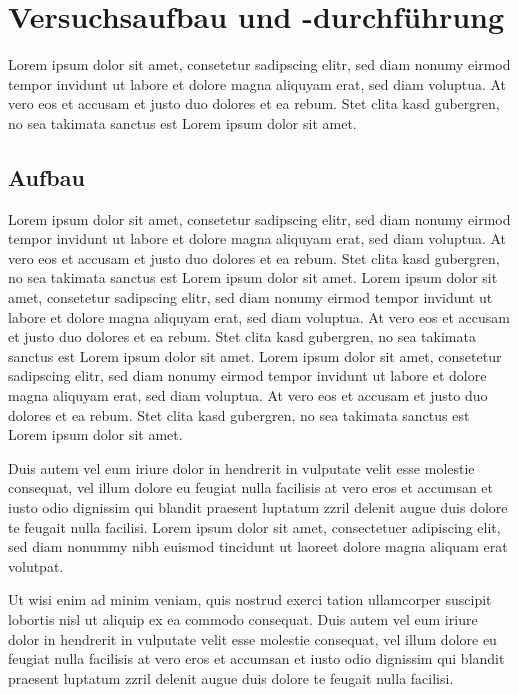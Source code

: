 \section{Versuchsaufbau und -durchführung} \label{sec:aufbau}

Lorem ipsum dolor sit amet, consetetur sadipscing elitr, sed diam nonumy eirmod tempor invidunt ut labore et dolore magna aliquyam erat, sed diam voluptua.
At vero eos et accusam et justo duo dolores et ea rebum.
Stet clita kasd gubergren, no sea takimata sanctus est Lorem ipsum dolor sit amet.

\subsection*{Aufbau}
	
	Lorem ipsum dolor sit amet, consetetur sadipscing elitr, sed diam nonumy eirmod tempor invidunt ut labore et dolore magna aliquyam erat, sed diam voluptua.
	At vero eos et accusam et justo duo dolores et ea rebum.
	Stet clita kasd gubergren, no sea takimata sanctus est Lorem ipsum dolor sit amet.
	Lorem ipsum dolor sit amet, consetetur sadipscing elitr, sed diam nonumy eirmod tempor invidunt ut labore et dolore magna aliquyam erat, sed diam voluptua.
	At vero eos et accusam et justo duo dolores et ea rebum.
	Stet clita kasd gubergren, no sea takimata sanctus est Lorem ipsum dolor sit amet.
	Lorem ipsum dolor sit amet, consetetur sadipscing elitr, sed diam nonumy eirmod tempor invidunt ut labore et dolore magna aliquyam erat, sed diam voluptua.
	At vero eos et accusam et justo duo dolores et ea rebum.
	Stet clita kasd gubergren, no sea takimata sanctus est Lorem ipsum dolor sit amet.
	
	Duis autem vel eum iriure dolor in hendrerit in vulputate velit esse molestie consequat, vel illum dolore eu feugiat nulla facilisis at vero eros et accumsan et iusto odio dignissim qui blandit praesent luptatum zzril delenit augue duis dolore te feugait nulla facilisi.
	Lorem ipsum dolor sit amet, consectetuer adipiscing elit, sed diam nonummy nibh euismod tincidunt ut laoreet dolore magna aliquam erat volutpat.
	
	Ut wisi enim ad minim veniam, quis nostrud exerci tation ullamcorper suscipit lobortis nisl ut aliquip ex ea commodo consequat.
	Duis autem vel eum iriure dolor in hendrerit in vulputate velit esse molestie consequat, vel illum dolore eu feugiat nulla facilisis at vero eros et accumsan et iusto odio dignissim qui blandit praesent luptatum zzril delenit augue duis dolore te feugait nulla facilisi.
	
